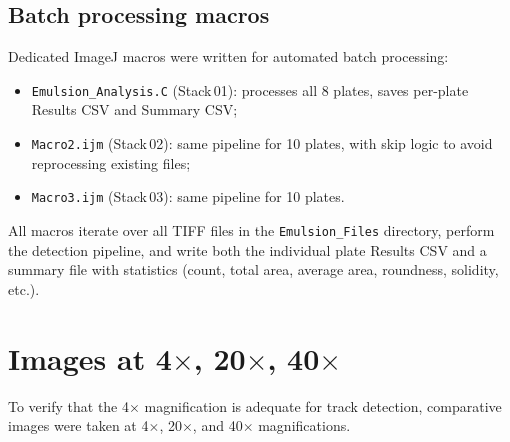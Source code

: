 \documentclass[12pt,a4paper]{article}
\begin{document}
\subsection{Batch processing macros}

Dedicated ImageJ macros were written for automated batch processing:

\begin{itemize}
  \item \texttt{Emulsion\_Analysis.C} (Stack\,01): processes all 8
        plates, saves per-plate Results CSV and Summary CSV;
  \item \texttt{Macro2.ijm} (Stack\,02): same pipeline for 10 plates,
        with skip logic to avoid reprocessing existing files;
  \item \texttt{Macro3.ijm} (Stack\,03): same pipeline for 10 plates.
\end{itemize}

All macros iterate over all TIFF files in the \texttt{Emulsion\_Files}
directory, perform the detection pipeline, and write both the
individual plate Results CSV and a summary file with statistics
(count, total area, average area, roundness, solidity, etc.).

\section{Images at 4$\times$, 20$\times$, 40$\times$}
\label{sec:images}

To verify that the 4$\times$ magnification is adequate for track
detection, comparative images were taken at 4$\times$, 20$\times$,
and 40$\times$ magnifications.
\end{document}
